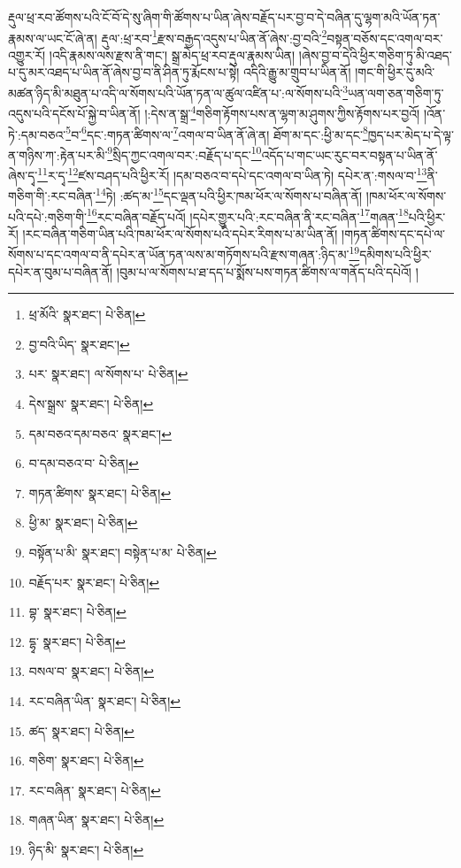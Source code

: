 རྡུལ་ཕྲ་རབ་ཚོགས་པའི་ངོ་བོ་དེ་སུ་ཞིག་གི་ཚོགས་པ་ཡིན་ཞེས་བརྗོད་པར་བྱ་བ་དེ་བཞིན་དུ་ལྷག་མའི་ཡོན་ཏན་རྣམས་ལ་ཡང་ངོ་ཞེ་ན། རྡུལ་:ཕྲ་རབ་\footnote{ཕྲ་མོའི་  སྣར་ཐང་།  པེ་ཅིན། }རྫས་བརྒྱད་འདུས་པ་ཡིན་ནོ་ཞེས་:བྱ་བའི་\footnote{བྱ་བའི་ཡིད་  སྣར་ཐང་། }བསྟན་བཅོས་དང་འགལ་བར་འགྱུར་རོ། །འདི་རྣམས་ལས་རྫས་ནི་གང་། སྒྲ་མེད་ཕྲ་རབ་རྡུལ་རྣམས་ཡིན། །ཞེས་བྱ་བ་དེའི་ཕྱིར་གཅིག་ཏུ་མི་འཐད་པ་དུ་མར་འཐད་པ་ཡིན་ནོ་ཞེས་བྱ་བ་ནི་ཤིན་ཏུ་རྨོངས་པ་སྟེ། འདིའི་རྒྱུ་མ་གྲུབ་པ་ཡིན་ནོ། །གང་གི་ཕྱིར་དུ་མའི་མཚན་ཉིད་མི་མཐུན་པ་འདི་ལ་སོགས་པའི་ཡོན་ཏན་ལ་ཚུལ་འཛིན་པ་:ལ་སོགས་པའི་\footnote{པར་  སྣར་ཐང་། ལ་སོགས་པ་  པེ་ཅིན། }ཡན་ལག་ཅན་གཅིག་ཏུ་འདུས་པའི་དངོས་པོ་སྐྱེ་བ་ཡིན་ནོ། །:དེས་ན་སྒྲ་\footnote{དེས་སྒྲས་  སྣར་ཐང་།  པེ་ཅིན། }གཅིག་རྟོགས་པས་ན་ལྷག་མ་ཤུགས་ཀྱིས་རྟོགས་པར་བྱའོ། །འོན་ཏེ་:དམ་བཅའ་\footnote{དམ་བཅའ་དམ་བཅའ་  སྣར་ཐང་། }བ་\footnote{བ་དམ་བཅའ་བ་  པེ་ཅིན། }དང་:གཏན་ཚིགས་ལ་\footnote{གཏན་ཚིགས་  སྣར་ཐང་།  པེ་ཅིན། }འགལ་བ་ཡིན་ནོ་ཞེ་ན། ཐོག་མ་དང་:ཕྱི་མ་དང་\footnote{ཕྱི་མ་  སྣར་ཐང་།  པེ་ཅིན། }ཁྱད་པར་མེད་པ་དེ་ལྟ་ན་གཉིས་ཀ་:རྟེན་པར་མི་\footnote{བསྟོན་པ་མི་  སྣར་ཐང་། བསྟེན་པ་མ་  པེ་ཅིན། }སྲིད་ཀྱང་འགལ་བར་:བརྗོད་པ་དང་\footnote{བརྗོད་པར་  སྣར་ཐང་།  པེ་ཅིན། }འདོད་པ་གང་ཡང་རུང་བར་བསྟན་པ་ཡིན་ནོ་ཞེས་དྭ་\footnote{བྷ་  སྣར་ཐང་།  པེ་ཅིན། }ར་དྭ་\footnote{དྷྭ་  སྣར་ཐང་།  པེ་ཅིན། }ཛས་བཤད་པའི་ཕྱིར་རོ། །དམ་བཅའ་བ་དཔེ་དང་འགལ་བ་ཡིན་ཏེ། དཔེར་ན་:གསལ་བ་\footnote{བསལ་བ་  སྣར་ཐང་།  པེ་ཅིན། }ནི་གཅིག་གི་:རང་བཞིན་\footnote{རང་བཞིན་ཡིན་  སྣར་ཐང་།  པེ་ཅིན། }ཏེ། :ཚད་མ་\footnote{ཚད་  སྣར་ཐང་།  པེ་ཅིན། }དང་ལྡན་པའི་ཕྱིར་ཁམ་ཕོར་ལ་སོགས་པ་བཞིན་ནོ། །ཁམ་ཕོར་ལ་སོགས་པའི་དཔེ་:གཅིག་གི་\footnote{གཅིག་  སྣར་ཐང་།  པེ་ཅིན། }རང་བཞིན་བརྗོད་པའོ། །དཔེར་གྱུར་པའི་:རང་བཞིན་ནི་རང་བཞིན་\footnote{རང་བཞིན་  སྣར་ཐང་།  པེ་ཅིན། }གཞན་\footnote{གཞན་ཡིན་  སྣར་ཐང་།  པེ་ཅིན། }པའི་ཕྱིར་རོ། །རང་བཞིན་གཅིག་ཡིན་པའི་ཁམ་ཕོར་ལ་སོགས་པའི་དཔེར་རིགས་པ་མ་ཡིན་ནོ། །གཏན་ཚིགས་དང་དཔེ་ལ་སོགས་པ་དང་འགལ་བ་ནི་དཔེར་ན་ཡོན་ཏན་ལས་མ་གཏོགས་པའི་རྫས་གཞན་:ཉིད་མ་\footnote{ཉིད་མི་  སྣར་ཐང་།  པེ་ཅིན། }དམིགས་པའི་ཕྱིར་དཔེར་ན་བུམ་པ་བཞིན་ནོ། །བུམ་པ་ལ་སོགས་པ་ཐ་དད་པ་སྨོས་པས་གཏན་ཚིགས་ལ་གནོད་པའི་དཔེའོ། །

